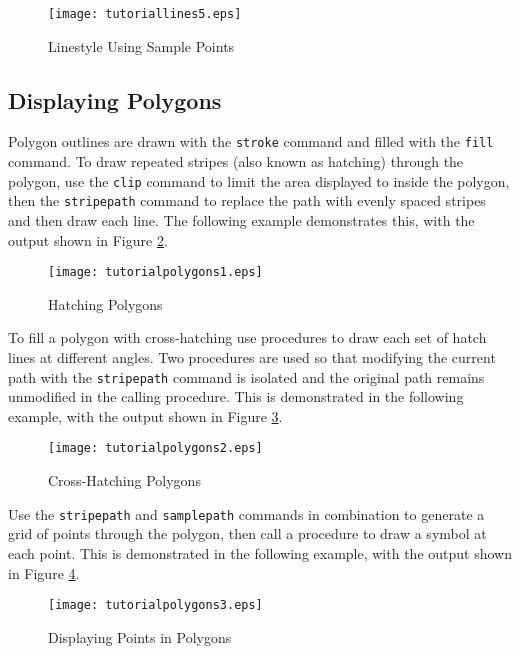 

\begin{figure}[h]
\texttt{[image: tutoriallines5.eps]}
\caption{Linestyle Using Sample Points}
\label{tutoriallines5}
\end{figure}

\subsection{Displaying Polygons}

Polygon outlines are drawn with the \texttt{stroke}
command and filled with the \texttt{fill} command.
To draw repeated stripes (also known as hatching) through
the polygon, use the \texttt{clip}
command to limit the area displayed to inside the polygon,
then the \texttt{stripepath}
command to replace the path with evenly spaced stripes and
then draw each line.  The following example demonstrates this,
with the output shown in Figure \ref{tutorialpolygons1}.



\begin{figure}[h]
\texttt{[image: tutorialpolygons1.eps]}
\caption{Hatching Polygons}
\label{tutorialpolygons1}
\end{figure}

To fill a polygon with cross-hatching use procedures to
draw each set of hatch lines at different angles.  Two procedures
are used so that modifying the current path with the
\texttt{stripepath}
command is isolated and the original path remains unmodified in
the calling procedure.
This is demonstrated in the following example, with the output
shown in Figure \ref{tutorialpolygons2}.



\begin{figure}[h]
\texttt{[image: tutorialpolygons2.eps]}
\caption{Cross-Hatching Polygons}
\label{tutorialpolygons2}
\end{figure}

Use the \texttt{stripepath} and \texttt{samplepath}
commands in combination to generate a grid of points through the
polygon, then call a procedure to draw a symbol at each point.
This is demonstrated in the following example, with the output
shown in Figure \ref{tutorialpolygons3}.



\begin{figure}[h]
\texttt{[image: tutorialpolygons3.eps]}
\caption{Displaying Points in Polygons}
\label{tutorialpolygons3}
\end{figure}

